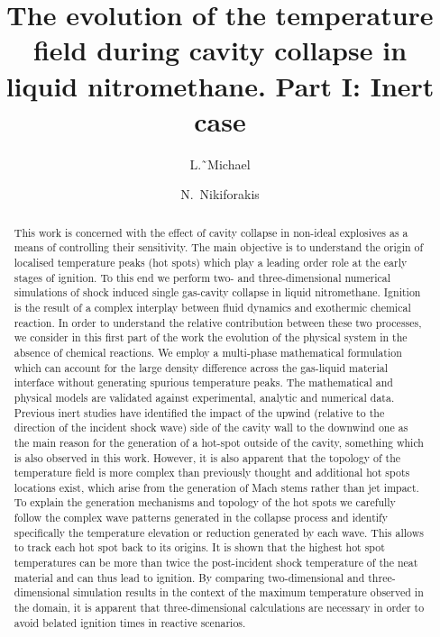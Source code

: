 \documentclass[3p,times,twocolumn]{elsarticle}
\begin{document}
\begin{frontmatter}
\title{The evolution of the temperature field during cavity collapse in liquid nitromethane. Part I: Inert case}

\author[cav]{L.˜Michael}

\author[cav]{N.~Nikiforakis}

\address[cav]{Laboratory for Scientific Computing, Cavendish Laboratory, Department of Physics, University of Cambridge, UK}


\begin{abstract}

This work is concerned with the effect of
cavity collapse in non-ideal explosives as a means of
controlling their sensitivity. The main objective is to
understand the origin of localised temperature peaks
(hot spots) which play a leading order role at the
early stages of ignition. To this end we perform two- and
three-dimensional numerical simulations of shock induced
single gas-cavity collapse in liquid nitromethane. Ignition
is the result of a complex interplay between fluid dynamics
and exothermic chemical reaction. In order to understand the
relative contribution between these two processes, we
consider in this first part of the work the evolution of
the physical system in the absence of chemical reactions.
We employ a multi-phase mathematical formulation which can
account for the large density difference across the gas-liquid
material interface without generating spurious temperature
peaks. The mathematical and physical models are validated
against experimental, analytic and numerical data. Previous
inert studies have identified the impact of the upwind (relative to
the direction of the incident shock wave) side of the
cavity wall to the downwind one as the main reason for the
generation of a hot-spot outside of the cavity, something which is also
observed in this work. However, it is also apparent that the
topology of the temperature field is more complex than
previously thought and additional hot spots locations exist,
which arise from the generation of Mach stems rather than
jet impact. To explain the generation mechanisms and
topology of the hot spots we carefully follow the complex
wave patterns generated in the collapse process
and identify specifically the temperature elevation or
reduction generated by each wave. This allows to track
each hot spot back to its origins. It is shown that the highest
hot spot temperatures can be more than twice
the post-incident shock temperature of the
neat material and can thus lead to ignition. By comparing
two-dimensional and three-dimensional simulation
results in the context of the maximum temperature observed
in the domain, it is apparent that three-dimensional calculations
are necessary in order to avoid belated ignition times in reactive
scenarios.
\end{abstract}


\end{frontmatter}
\end{document}
